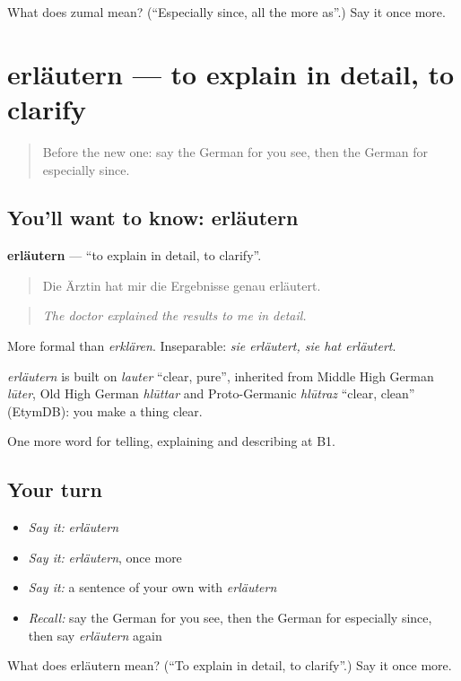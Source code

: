 \begin{tcolorbox}[breakable,colback=teal!4,colframe=teal!35!black,title={Before you move on}]
What does zumal mean? (\textquotedblleft{}Especially since, all the more as\textquotedblright{}.) Say it once more.
\end{tcolorbox}
\section[erläutern]{erläutern — to explain in detail, to clarify}

\label{lesson:GE-C332-erlaeutern}



\begin{quote}
Before the new one: say the German for you see, then the German for especially since.
\end{quote}

\subsection*{You'll want to know: erläutern}
\textbf{erläutern} — \textquotedblleft{}to explain in detail, to clarify\textquotedblright{}.

\begin{quote}
Die Ärztin hat mir die Ergebnisse genau erläutert.
\end{quote}

\begin{quote}
\emph{The doctor explained the results to me in detail.}
\end{quote}

More formal than \emph{erklären}. Inseparable: \emph{sie erläutert, sie hat erläutert}.

\begin{cousinweb}
\emph{erläutern} is built on \emph{lauter} \textquotedblleft{}clear, pure\textquotedblright{}, inherited from Middle High German \emph{lūter}, Old High German \emph{hlūttar} and Proto-Germanic \emph{hlūtraz} \textquotedblleft{}clear, clean\textquotedblright{} (EtymDB): you make a thing clear.
\end{cousinweb}

\begin{grammarlens}[title={What you've built}]
One more word for telling, explaining and describing at B1.
\end{grammarlens}

\subsection*{Your turn}
\begin{itemize}
\raggedright
  \item \emph{Say it:} \emph{erläutern}
  \item \emph{Say it:} \emph{erläutern}, once more
  \item \emph{Say it:} a sentence of your own with \emph{erläutern}
  \item \emph{Recall:} say the German for you see, then the German for especially since, then say \emph{erläutern} again
\end{itemize}

\begin{tcolorbox}[breakable,colback=teal!4,colframe=teal!35!black,title={Before you move on}]
What does erläutern mean? (\textquotedblleft{}To explain in detail, to clarify\textquotedblright{}.) Say it once more.
\end{tcolorbox}
